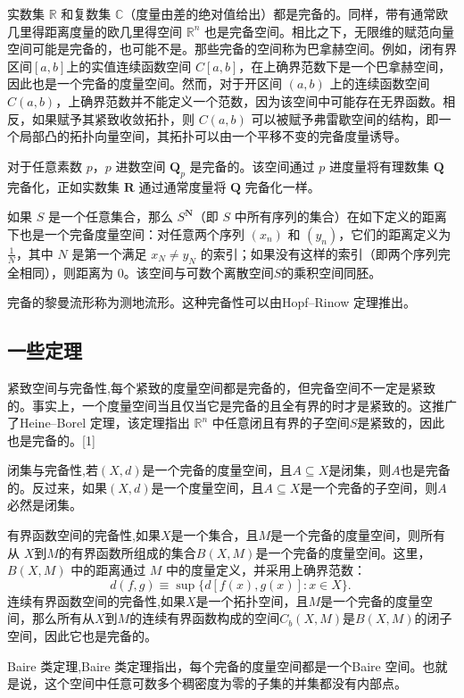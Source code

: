 实数集 $\mathbb{R}$ 和复数集 $\mathbb{C}$（度量由差的绝对值给出）都是完备的。同样，带有通常欧几里得距离度量的欧几里得空间 $\mathbb{R}^n$ 也是完备空间。相比之下，无限维的赋范向量空间可能是完备的，也可能不是。那些完备的空间称为巴拿赫空间。例如，闭有界区间$[a, b]$上的实值连续函数空间 $C[a,b]$，在上确界范数下是一个巴拿赫空间，因此也是一个完备的度量空间。然而，对于开区间 $(a, b)$ 上的连续函数空间 $C(a,b)$，上确界范数并不能定义一个范数，因为该空间中可能存在无界函数。相反，如果赋予其紧致收敛拓扑，则 $C(a,b)$ 可以被赋予弗雷歇空间的结构，即一个局部凸的拓扑向量空间，其拓扑可以由一个平移不变的完备度量诱导。


对于任意素数 $p$，$p$ 进数空间 $\mathbf{Q}_p$ 是完备的。该空间通过 $p$ 进度量将有理数集 $\mathbf{Q}$ 完备化，正如实数集 $\mathbf{R}$ 通过通常度量将 $\mathbf{Q}$ 完备化一样。

如果 $S$ 是一个任意集合，那么 $S^{\mathbf{N}}$（即 $S$ 中所有序列的集合）在如下定义的距离下也是一个完备度量空间：对任意两个序列 $\left(x_n\right)$ 和 $\left(y_n\right)$，它们的距离定义为$\frac{1}{N}$，其中 $N$ 是第一个满足 $x_N \neq y_N$ 的索引；如果没有这样的索引（即两个序列完全相同），则距离为 $0$。该空间与可数个离散空间$S$的乘积空间同胚。

完备的黎曼流形称为测地流形。这种完备性可以由Hopf–Rinow 定理推出。
\subsection{一些定理}
紧致空间与完备性,每个紧致的度量空间都是完备的，但完备空间不一定是紧致的。事实上，一个度量空间当且仅当它是完备的且全有界的时才是紧致的。这推广了Heine–Borel 定理，该定理指出 $\mathbb{R}^n$ 中任意闭且有界的子空间$S$是紧致的，因此也是完备的。[1]

闭集与完备性,若$(X,d)$是一个完备的度量空间，且$A \subseteq X$是闭集，则$A$也是完备的。反过来，如果$(X,d)$是一个度量空间，且$A \subseteq X$是一个完备的子空间，则$A$必然是闭集。

有界函数空间的完备性,如果$X$是一个集合，且$M$是一个完备的度量空间，则所有从 $X$到$M$的有界函数所组成的集合$B(X,M)$是一个完备的度量空间。这里，$B(X,M)$ 中的距离通过 $M$ 中的度量定义，并采用上确界范数：
  $$
  d(f,g) \equiv \sup \{ d[f(x),g(x)] : x \in X \}.~
  $$
连续有界函数空间的完备性,如果$X$是一个拓扑空间，且$M$是一个完备的度量空间，那么所有从$X$到$M$的连续有界函数构成的空间$C_b(X,M)$是$B(X,M)$的闭子空间，因此它也是完备的。

Baire 类定理,Baire 类定理指出，每个完备的度量空间都是一个Baire 空间。也就是说，这个空间中任意可数多个稠密度为零的子集的并集都没有内部点。

